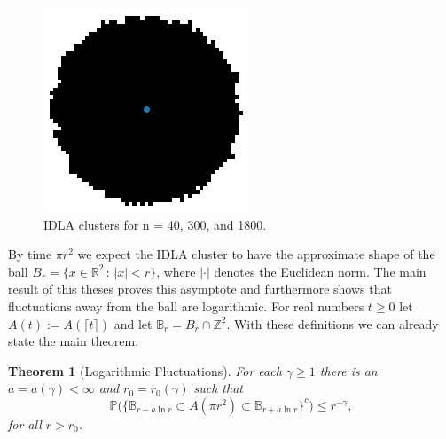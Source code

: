 \documentclass[11pt]{article}
\numberwithin{equation}{section}
\newtheorem{theorem}{Theorem}
\begin{document}
\begin{figure}[!htb]
  \endminipage\hfill
    \includegraphics[width=\linewidth]{idla_1800.png}
  \endminipage
  \caption[placeholder]{IDLA clusters for n = 40, 300, and 1800. \footnotemark}
\end{figure}


By time $\pi r^2$ we expect the IDLA cluster to 
have the approximate shape of the ball
$ \label{D: B_r} \nonumber B_r = \{x \in \mathbb{R}^2 \,:\,  |x| < r \}$, 
where $|\cdot|$ denotes the Euclidean norm. 
The main result of this theses proves this asymptote 
and furthermore shows that fluctuations away from the ball are logarithmic. 
For real numbers $t \geq 0$ let $A(t) := A(\lceil t \rceil)$ 
and let $\mathbb{B}_r = B_r \cap \mathbb{Z}^2 \label{D: mathbb(B)_r}$.  
With these definitions we can already state the main theorem. 

\begin{theorem}[Logarithmic Fluctuations] 
  \label{log fluctuation}
  For each $\gamma \geq 1$ there is an 
  \hbox{$a = a(\gamma) < \infty$}
  and $r_0 = r_0(\gamma)$ such that 
  $$
  \mathbb{P} \big( \{ 
    \mathbb{B}_{r-a\ln r} 
      \subset A(\pi r^2) \subset \mathbb{B}_{r+a\ln r} \}
      ^c \big)
    \leq r^{-\gamma},
  $$
  for all $r > r_0$.  
\end{theorem}
\end{document}

